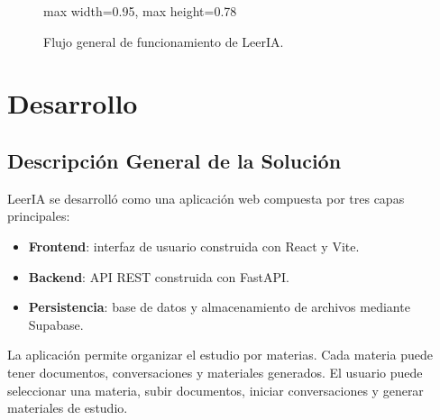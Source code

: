 \documentclass[12pt, letterpaper]{article}
\begin{document}
\begin{figure}[H]
\begin{adjustbox}{max width=0.95\textwidth, max height=0.78\textheight}
		\end{adjustbox}
		\caption{Flujo general de funcionamiento de LeerIA.}
		\label{fig:flujo-leeria}
	\end{figure}
	

	\section{Desarrollo}

	
	\subsection{Descripción General de la Solución}
	
	LeerIA se desarrolló como una aplicación web compuesta por tres capas principales:
	
	\begin{itemize}
		\item \textbf{Frontend}: interfaz de usuario construida con React y Vite.
		\item \textbf{Backend}: API REST construida con FastAPI.
		\item \textbf{Persistencia}: base de datos y almacenamiento de archivos mediante Supabase.
	\end{itemize}
	
	La aplicación permite organizar el estudio por materias. Cada materia puede tener documentos, conversaciones y materiales generados. El usuario puede seleccionar una materia, subir documentos, iniciar conversaciones y generar materiales de estudio.
	
\end{document}
